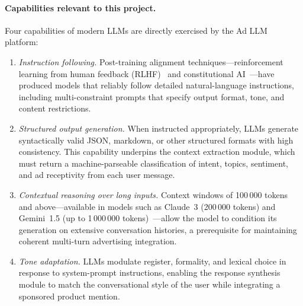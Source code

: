\paragraph{Capabilities relevant to this project.}
Four capabilities of modern LLMs are directly exercised by the Ad LLM
platform:

\begin{enumerate}[label=(\roman*), leftmargin=2.5em]
  \item \emph{Instruction following.} Post-training alignment
    techniques---reinforcement learning from human feedback
    (RLHF)~\cite{ouyang2022instructgpt} and constitutional
    AI~\cite{bai2022constitutional}---have produced models that
    reliably follow detailed natural-language instructions, including
    multi-constraint prompts that specify output format, tone, and
    content restrictions.

  \item \emph{Structured output generation.} When instructed
    appropriately, LLMs generate syntactically valid JSON, markdown,
    or other structured formats with high consistency. This capability
    underpins the context extraction module, which must return a
    machine-parseable classification of intent, topics, sentiment, and
    ad receptivity from each user message.

  \item \emph{Contextual reasoning over long inputs.} Context windows
    of 100\,000 tokens and above---available in models such as
    Claude~3 (200\,000 tokens) and Gemini~1.5 (up to 1\,000\,000
    tokens)~\cite{anthropic2024claude3, google2024gemini}---allow the
    model to condition its generation on extensive conversation
    histories, a prerequisite for maintaining coherent multi-turn
    advertising integration.

  \item \emph{Tone adaptation.} LLMs modulate register, formality, and
    lexical choice in response to system-prompt instructions, enabling
    the response synthesis module to match the conversational style of
    the user while integrating a sponsored product mention.
\end{enumerate}

